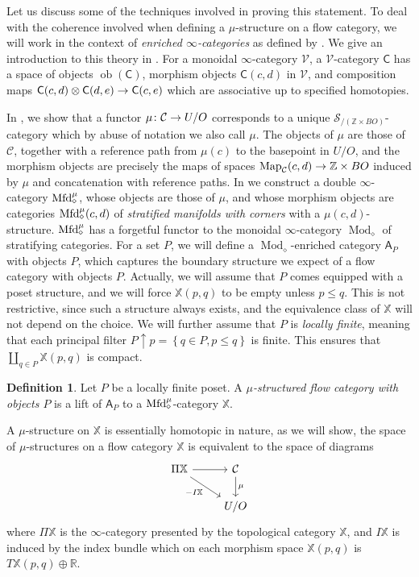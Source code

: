 \documentclass[10pt]{amsart}
\numberwithin{equation}{section}
\theoremstyle{definition}
\newtheorem{definition}[prop]{Definition}
\DeclareMathOperator{\Map}{Map}
\DeclareMathOperator{\Mod}{Mod}
\DeclareMathOperator{\ob}{ob}
\newcommand{\Mfd}{\mathrm{Mfd}\vphantom{d}}
\newcommand{\bZ}{\mathbb{Z}}
\newcommand{\bR}{\mathbb{R}}
\newcommand{\bX}{\mathbb{X}}
\newcommand{\cC}{\mathcal{C}}
\newcommand{\cS}{\mathcal{S}}
\newcommand{\cV}{\mathcal{V}}
\newcommand{\sfA}{\mathsf{A}}
\newcommand{\sfC}{\mathsf{C}}
\renewcommand{\to}{\mathchoice{\longrightarrow}{\rightarrow}{}{}}
\begin{document}
Let us discuss some of the techniques involved in proving this statement. To deal with the coherence involved when defining a $\mu$-structure on a flow category, we will work in the context of \emph{enriched $\infty$-categories} as defined by \cite{GH}. We give an introduction to this theory in . For a monoidal $\infty$-category $\cV$, a $\cV$-category $\sfC$ has a space of objects $\ob(\sfC)$, morphism objects $\sfC(c,d)$ in $\cV$, and composition maps $\sfC(c,d)\otimes \sfC(d,e) \to \sfC(c,e)$ which are associative up to specified homotopies.

In , we show that a functor $\mu\colon \cC \to U/O$ corresponds to a unique $\cS_{/ (\bZ\times BO)}$-category which by abuse of notation we also call $\mu$.
The objects of $\mu$ are those of $\cC$, together with a reference path from $\mu(c)$ to the basepoint in $U/O$, and the morphism objects are precisely the maps of spaces $\Map_{\cC}(c,d) \to \bZ\times BO$ induced by $\mu$ and concatenation with reference paths.
In  we construct a double $\infty$-category $\Mfd^{\mu}_{\diamond}$, whose objects are those of $\mu$, and whose morphism objects are categories $\Mfd^{\mu}_{\diamond}(c,d)$ of \emph{stratified manifolds with corners} with a $\mu(c,d)$-structure. $\Mfd_{\diamond}^{\mu}$ has a forgetful functor to the monoidal $\infty$-category $\Mod_{\diamond}$ of stratifying categories.
For a set $P$, we will define a $\Mod_{\diamond}$-enriched category $\sfA_{P}$ with objects $P$, which captures the boundary structure we expect of a flow category with objects $P$.
Actually, we will assume that $P$ comes equipped with a poset structure, and we will force $\bX(p,q)$ to be empty unless $p\leq q$. This is not restrictive, since such a structure always exists, and the equivalence class of $\bX$ will not depend on the choice. We will further assume that $P$ is \emph{locally finite}, meaning that each principal filter $P\uparrow p = \left\{q\in P, p\leq q\right\}$ is finite. This ensures that $\coprod_{q\in P} \bX(p,q)$ is compact.

\begin{definition}\label{def:intro_flowcategory}
	Let $P$ be a locally finite poset. A \emph{$\mu$-structured flow category with objects $P$} is a lift of $\sfA_{P}$ to a $\Mfd^{\mu}_{\diamond}$-category $\bX$.
\end{definition}
A $\mu$-structure on $\bX$ is essentially homotopic in nature, as we will show, the space of $\mu$-structures on a flow category $\bX$ is equivalent to the space of diagrams
\begin{equation*}
	\begin{tikzcd}
		\Pi\bX \arrow[r] \arrow[dr, "-I\bX"']      &   \cC  \arrow[d,"\mu"] \\
		            &   U/O
	\end{tikzcd}
\end{equation*}
where $\Pi\bX$ is the $\infty$-category presented by the topological category $\bX$, and $I\bX$ is induced by the index bundle which on each morphism space $\bX(p,q)$ is $T\bX(p,q)\oplus \bR$.
\end{document}
